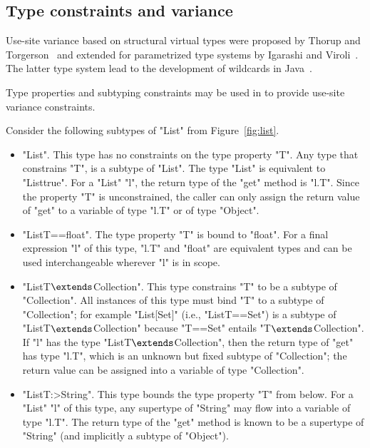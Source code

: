 \subsection{Type constraints and variance}
\label{sec:variance}
Use-site variance based on structural virtual types were proposed by
Thorup and Torgerson~\cite{unifying-genericity} and extended for
parametrized type systems by Igarashi and
Viroli~\cite{variant-parametric-types}.  The latter type system lead
to the development of wildcards in
Java~\cite{Java3,adding-wildcards,wildcards-safe}.

Type properties and subtyping constraints may be used in \Xten{} to 
provide use-site variance
constraints.

Consider the following subtypes  of \xcd"List" from
Figure~\ref{fig:list}.
\begin{itemize}
\item \xcd"List".  This type has no constraints on the type
property \xcd"T".
Any type that constrains \xcd"T",
is a subtype of \xcd"List".  The type \xcd"List" is equivalent to
\xcd"List{true}".
%
For a \xcd"List" \xcd"l", the return type of the \xcd"get" method
is \xcd"l.T".
Since the property \xcd"T" is unconstrained,
the caller can only assign the return value of \xcd"get"
to a variable of type \xcd"l.T" or of type \xcd"Object".

\item \xcd"List{T==float}".
The type property \xcd"T" is bound to \xcd"float".
For a final expression \xcd"l" of this type,
\xcd"l.T" and \xcd"float" are equivalent types and can be used
interchangeable wherever \xcd"l" is in scope.

\item \xcdmath"List{T$\extends$Collection}".
This type constrains \xcd"T" to be a subtype of \xcd"Collection".
All instances of this type must bind \xcd"T" to a subtype of
\xcd"Collection"; for example \xcd"List[Set]" (i.e.,
\xcd"List{T==Set}") is a subtype of
\xcdmath"List{T$\extends$Collection}" because \xcd"T==Set" entails
\xcdmath"T$\extends$Collection".
%
If \xcd"l" has the type \xcdmath"List{T$\extends$Collection}",
then the return type of \xcd"get" has type \xcd"l.T", which is an unknown but
fixed subtype of \xcd"Collection"; the return value can be
assigned into a variable of type \xcd"Collection".

\item \xcd"List{T:>String}".  This type bounds the type property
\xcd"T"
from below.  For a \xcd"List" \xcd"l" of this type, any
supertype of \xcd"String" may flow into a variable of type \xcd"l.T".
The return type of the \xcd"get"
method is known to be a
supertype of \xcd"String" (and implicitly a subtype of \xcd"Object").
\end{itemize}

